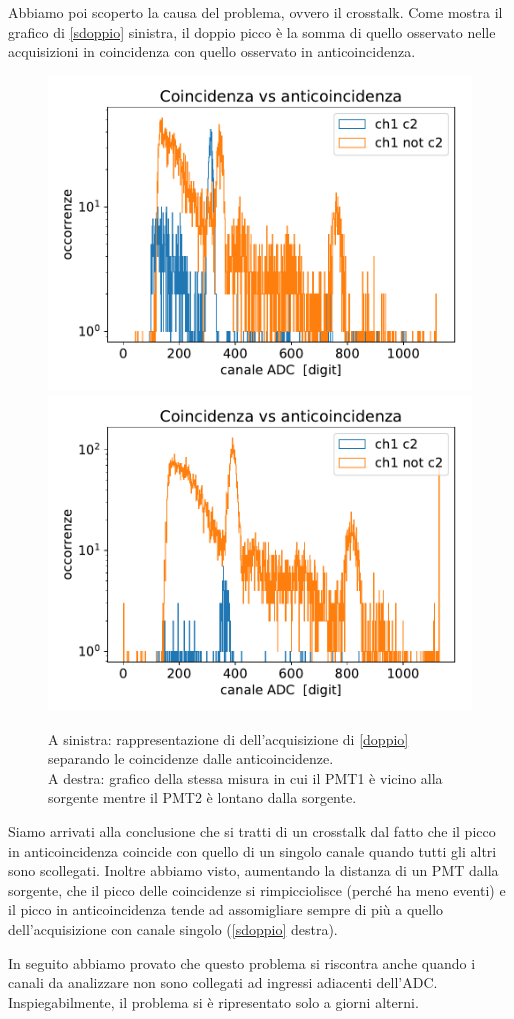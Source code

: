 
Abbiamo poi scoperto la causa del problema, ovvero il crosstalk.
Come mostra il grafico di \autoref{sdoppio} sinistra, il doppio picco è la somma di quello osservato nelle acquisizioni in coincidenza con quello osservato in anticoincidenza. 

\begin{figure}[h]
\centering
\subfloat
{
\includegraphics[width=18 em]{immagini/sdoppio}
}
\subfloat
{
\includegraphics[width=18 em]{immagini/dist}
}
\caption{A sinistra: rappresentazione di dell'acquisizione di \autoref{doppio} separando le coincidenze dalle anticoincidenze. \\
A destra: grafico della stessa misura in cui il PMT1 è vicino alla sorgente mentre il PMT2 è lontano dalla sorgente.}
\label{sdoppio}
\end{figure}

Siamo arrivati alla conclusione che si tratti di un crosstalk dal fatto che il picco in anticoincidenza coincide con quello di un singolo canale quando tutti gli altri sono scollegati.
Inoltre abbiamo visto, aumentando la distanza di un PMT dalla sorgente, che il picco delle coincidenze si rimpicciolisce (perché ha meno eventi) e il picco in anticoincidenza tende ad assomigliare sempre di più a quello dell'acquisizione con canale singolo (\autoref{sdoppio} destra).


In seguito abbiamo provato che questo problema si riscontra anche quando i canali da analizzare non sono collegati ad ingressi adiacenti dell'ADC. Inspiegabilmente, il problema si è ripresentato solo a giorni alterni. 
